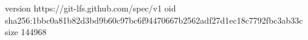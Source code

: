 version https://git-lfs.github.com/spec/v1
oid sha256:1bbc0a81b82d3bd9b60c97bc6f94470667b2562adf27d1ec18c7792fbc3ab33c
size 144968
